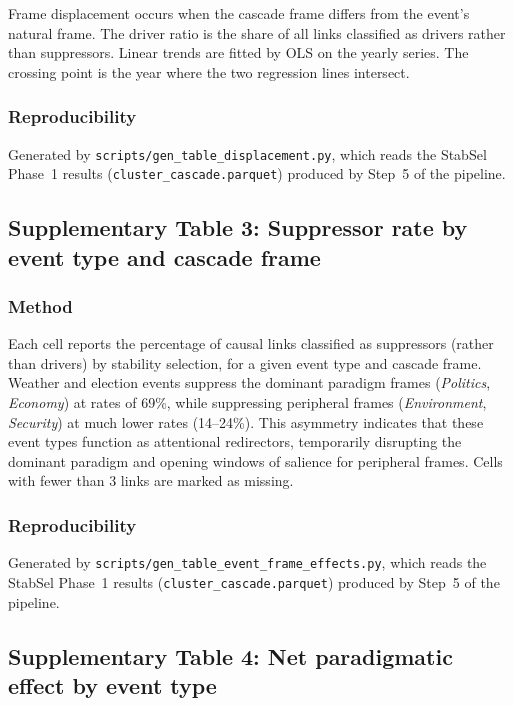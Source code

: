 Frame displacement occurs when the cascade frame differs from the event's natural frame. The driver ratio is the share of all links classified as drivers rather than suppressors. Linear trends are fitted by OLS on the yearly series. The crossing point is the year where the two regression lines intersect.

\subsubsection*{Reproducibility}
Generated by \texttt{scripts/gen\_table\_displacement.py}, which reads the StabSel Phase~1 results (\texttt{cluster\_cascade.parquet}) produced by Step~5 of the pipeline.


\newpage
\subsection*{Supplementary Table 3: Suppressor rate by event type and cascade frame}



\subsubsection*{Method}
Each cell reports the percentage of causal links classified as suppressors (rather than drivers) by stability selection, for a given event type and cascade frame. Weather and election events suppress the dominant paradigm frames (\emph{Politics}, \emph{Economy}) at rates of 69\%, while suppressing peripheral frames (\emph{Environment}, \emph{Security}) at much lower rates (14--24\%). This asymmetry indicates that these event types function as attentional redirectors, temporarily disrupting the dominant paradigm and opening windows of salience for peripheral frames. Cells with fewer than 3 links are marked as missing.

\subsubsection*{Reproducibility}
Generated by \texttt{scripts/gen\_table\_event\_frame\_effects.py}, which reads the StabSel Phase~1 results (\texttt{cluster\_cascade.parquet}) produced by Step~5 of the pipeline.


\newpage
\subsection*{Supplementary Table 4: Net paradigmatic effect by event type}

